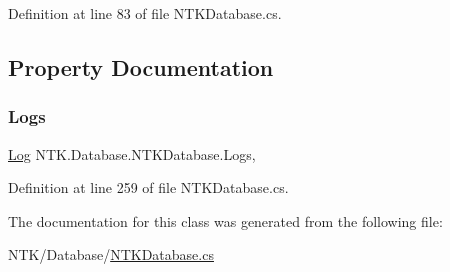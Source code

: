 Definition at line 83 of file N\+T\+K\+Database.\+cs.



\subsection{Property Documentation}
\mbox{\label{class_n_t_k_1_1_database_1_1_n_t_k_database_a6f78c025e2cfbf38d4916287ea9e8742}} 
\subsubsection{\texorpdfstring{Logs}{Logs}}
{\footnotesize\ttfamily \mbox{\hyperlink{class_n_t_k_1_1_i_o_1_1_log}{Log}} N\+T\+K.\+Database.\+N\+T\+K\+Database.\+Logs\hspace{0.3cm}{\ttfamily [get]}, {\ttfamily [set]}}







Definition at line 259 of file N\+T\+K\+Database.\+cs.



The documentation for this class was generated from the following file\+:\begin{DoxyCompactItemize}
\item 
N\+T\+K/\+Database/\mbox{\hyperlink{_n_t_k_database_8cs}{N\+T\+K\+Database.\+cs}}\end{DoxyCompactItemize}

